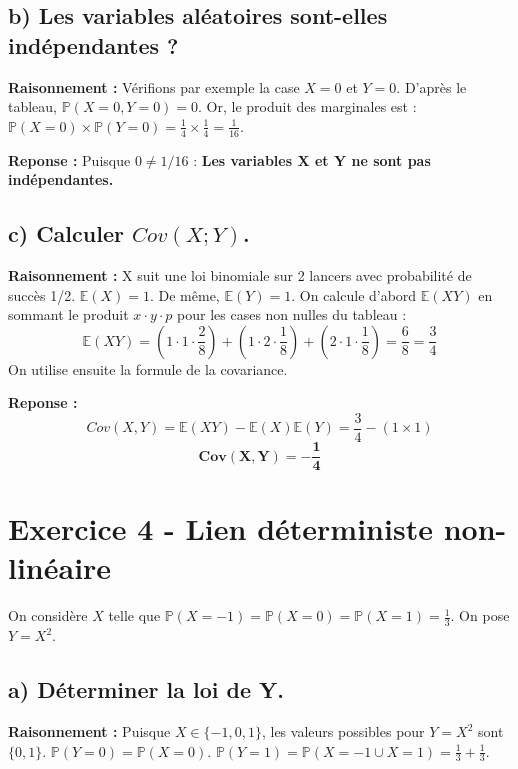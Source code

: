 \documentclass[11pt,a4paper]{article}
\begin{document}
\subsection*{b) Les variables aléatoires sont-elles indépendantes ?}

\textbf{Raisonnement :} 
Vérifions par exemple la case $X=0$ et $Y=0$. D'après le tableau, $\mathbb{P}(X=0, Y=0) = 0$.
Or, le produit des marginales est : $\mathbb{P}(X=0) \times \mathbb{P}(Y=0) = \frac{1}{4} \times \frac{1}{4} = \frac{1}{16}$.

\textbf{Reponse :}
Puisque $0 \neq 1/16$ : \textbf{Les variables X et Y ne sont pas indépendantes.}

\subsection*{c) Calculer $Cov(X;Y)$.}

\textbf{Raisonnement :} 
X suit une loi binomiale sur 2 lancers avec probabilité de succès 1/2. $\mathbb{E}(X) = 1$. De même, $\mathbb{E}(Y) = 1$.
On calcule d'abord $\mathbb{E}(XY)$ en sommant le produit $x \cdot y \cdot p$ pour les cases non nulles du tableau :
$$ \mathbb{E}(XY) = \left(1\cdot 1 \cdot \frac{2}{8}\right) + \left(1\cdot 2 \cdot \frac{1}{8}\right) + \left(2\cdot 1 \cdot \frac{1}{8}\right) = \frac{6}{8} = \frac{3}{4} $$
On utilise ensuite la formule de la covariance.

\textbf{Reponse :}
$$ Cov(X, Y) = \mathbb{E}(XY) - \mathbb{E}(X)\mathbb{E}(Y) = \frac{3}{4} - (1 \times 1) $$
$$ \mathbf{Cov(X, Y) = -\frac{1}{4}} $$

\hrulefill

\section*{Exercice 4 - Lien déterministe non-linéaire}

On considère $X$ telle que $\mathbb{P}(X=-1) = \mathbb{P}(X=0) = \mathbb{P}(X=1) = \frac{1}{3}$. On pose $Y = X^2$.

\subsection*{a) Déterminer la loi de Y.}

\textbf{Raisonnement :} 
Puisque $X \in \{-1, 0, 1\}$, les valeurs possibles pour $Y = X^2$ sont $\{0, 1\}$.
$\mathbb{P}(Y=0) = \mathbb{P}(X=0)$.
$\mathbb{P}(Y=1) = \mathbb{P}(X=-1 \cup X=1) = \frac{1}{3} + \frac{1}{3}$.
\end{document}
